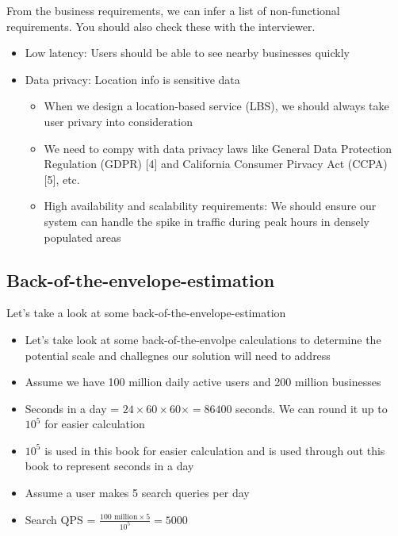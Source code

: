 \documentclass{report}
\newenvironment{defbox}[1]{%
  \tcolorbox[
    colback=black!5,
    colframe=darkgray,
    title=#1
  ]
}{%
  \endtcolorbox
}
\theoremstyle{definition}
\let\oldsubsection\subsection
\renewcommand{\subsection}{\oldsubsection*}
\begin{document}
From the business requirements, we can infer a list of non-functional requirements. You should also check these with the interviewer.

\begin{itemize}
\item
Low latency: Users should be able to see nearby businesses quickly
\item
Data privacy: Location info is sensitive data

\begin{itemize}
\item
When we design a location-based service (LBS), we should always take user privary into consideration
\item
We need to compy with data privacy laws like General Data Protection Regulation (GDPR) [4] and California Consumer Pirvacy Act (CCPA) [5], etc.
\item
High availability and scalability requirements: We should ensure our system can handle the spike in traffic during peak hours in densely populated areas
\end{itemize}
\end{itemize}


\subsection{Back-of-the-envelope-estimation}

Let's take a look at some back-of-the-envelope-estimation

\begin{itemize}
\item
Let's take look at some back-of-the-envolpe calculations to determine the potential scale and challegnes our solution will need to address
\item
Assume we have 100 million daily active users and 200 million businesses
\end{itemize}

\begin{defbox}{Calculate QPS}
\begin{itemize}
\item
Seconds in a day = $24 \times 60 \times 60 \times = 86400$ seconds. We can round it up to \( 10^5 \) for easier calculation
\item
\(10^5\) is used in this book for easier calculation and is used through out this book to represent seconds in a day
\item
Assume a user makes 5 search queries per day
\item
Search QPS = \(\frac{100 \text{ million} \times 5}{10^5} = 5000 \)
\end{itemize}
\end{defbox}
\end{document}
